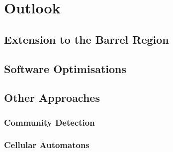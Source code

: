 

\section{Outlook}
\subsection{Extension to the Barrel Region}
\subsection{Software Optimisations}

\subsection{Other Approaches}
\subsubsection{Community Detection}
\subsubsection{Cellular Automatons}


